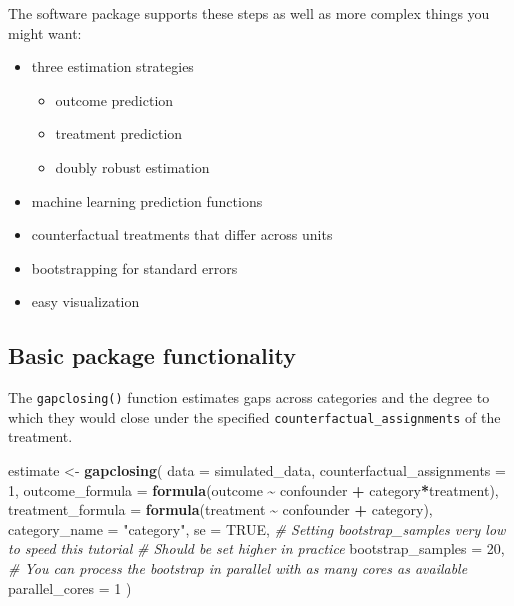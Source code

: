 \documentclass[
]{article}
\newenvironment{Shaded}{\begin{snugshade}}{\end{snugshade}}
\newcommand{\AttributeTok}[1]{\textcolor[rgb]{0.13,0.29,0.53}{#1}}
\newcommand{\CommentTok}[1]{\textcolor[rgb]{0.56,0.35,0.01}{\textit{#1}}}
\newcommand{\ConstantTok}[1]{\textcolor[rgb]{0.56,0.35,0.01}{#1}}
\newcommand{\DecValTok}[1]{\textcolor[rgb]{0.00,0.00,0.81}{#1}}
\newcommand{\FunctionTok}[1]{\textcolor[rgb]{0.13,0.29,0.53}{\textbf{#1}}}
\newcommand{\NormalTok}[1]{#1}
\newcommand{\OtherTok}[1]{\textcolor[rgb]{0.56,0.35,0.01}{#1}}
\newcommand{\SpecialCharTok}[1]{\textcolor[rgb]{0.81,0.36,0.00}{\textbf{#1}}}
\newcommand{\StringTok}[1]{\textcolor[rgb]{0.31,0.60,0.02}{#1}}
\providecommand{\tightlist}{%
  \setlength{\itemsep}{0pt}\setlength{\parskip}{0pt}}
\begin{document}
The software package supports these steps as well as more complex things you might want:

\begin{itemize}
\tightlist
\item
  three estimation strategies

  \begin{itemize}
  \tightlist
  \item
    outcome prediction
  \item
    treatment prediction
  \item
    doubly robust estimation
  \end{itemize}
\item
  machine learning prediction functions
\item
  counterfactual treatments that differ across units
\item
  bootstrapping for standard errors
\item
  easy visualization
\end{itemize}

\subsection{Basic package functionality}\label{basic-package-functionality}

The \texttt{gapclosing()} function estimates gaps across categories and the degree to which they would close under the specified \texttt{counterfactual\_assignments} of the treatment.

\begin{Shaded}
\begin{Highlighting}[]
\NormalTok{estimate }\OtherTok{\textless{}{-}} \FunctionTok{gapclosing}\NormalTok{(}
  \AttributeTok{data =}\NormalTok{ simulated\_data,}
  \AttributeTok{counterfactual\_assignments =} \DecValTok{1}\NormalTok{,}
  \AttributeTok{outcome\_formula =} \FunctionTok{formula}\NormalTok{(outcome }\SpecialCharTok{\textasciitilde{}}\NormalTok{ confounder }\SpecialCharTok{+}\NormalTok{ category}\SpecialCharTok{*}\NormalTok{treatment),}
  \AttributeTok{treatment\_formula =} \FunctionTok{formula}\NormalTok{(treatment }\SpecialCharTok{\textasciitilde{}}\NormalTok{ confounder }\SpecialCharTok{+}\NormalTok{ category),}
  \AttributeTok{category\_name =} \StringTok{"category"}\NormalTok{,}
  \AttributeTok{se =} \ConstantTok{TRUE}\NormalTok{,}
  \CommentTok{\# Setting bootstrap\_samples very low to speed this tutorial}
  \CommentTok{\# Should be set higher in practice}
  \AttributeTok{bootstrap\_samples =} \DecValTok{20}\NormalTok{,}
  \CommentTok{\# You can process the bootstrap in parallel with as many cores as available}
  \AttributeTok{parallel\_cores =} \DecValTok{1}
\NormalTok{)}
\end{Highlighting}
\end{Shaded}
\end{document}
